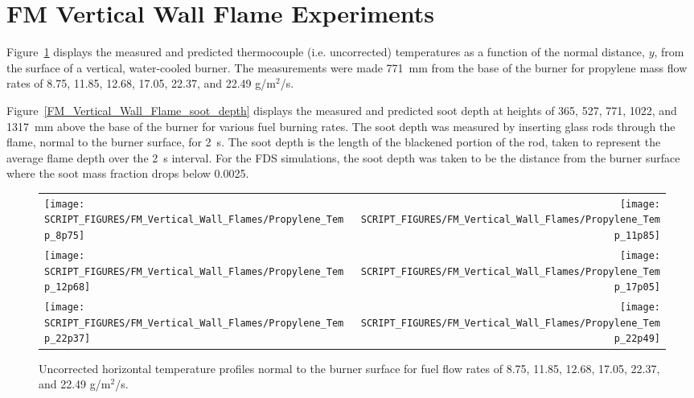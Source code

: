\clearpage

\section{FM Vertical Wall Flame Experiments}

Figure~\ref{FM_Vertical_Wall_Flame_temperature} displays the measured and predicted thermocouple (i.e. uncorrected) temperatures as a function of the normal distance, $y$, from the surface of a vertical, water-cooled burner. The measurements were made 771~mm from the base of the burner for propylene mass flow rates of 8.75, 11.85, 12.68, 17.05, 22.37, and 22.49 g/m$^2$/s.

Figure~\ref{FM_Vertical_Wall_Flame_soot_depth} displays the measured and predicted soot depth at heights of 365, 527, 771, 1022, and 1317~mm above the base of the burner for various fuel burning rates. The soot depth was measured by inserting glass rods through the flame, normal to the burner surface, for 2~s. The soot depth is the length of the blackened portion of the rod, taken to represent the average flame depth over the 2~s interval. For the FDS simulations, the soot depth was taken to be the distance from the burner surface where the soot mass fraction drops below 0.0025.

\begin{figure}[p]
\begin{tabular*}{\textwidth}{l@{\extracolsep{\fill}}r}
\texttt{[image: SCRIPT\_FIGURES/FM\_Vertical\_Wall\_Flames/Propylene\_Temp\_8p75]} &
\texttt{[image: SCRIPT\_FIGURES/FM\_Vertical\_Wall\_Flames/Propylene\_Temp\_11p85]} \\
\texttt{[image: SCRIPT\_FIGURES/FM\_Vertical\_Wall\_Flames/Propylene\_Temp\_12p68]} &
\texttt{[image: SCRIPT\_FIGURES/FM\_Vertical\_Wall\_Flames/Propylene\_Temp\_17p05]} \\
\texttt{[image: SCRIPT\_FIGURES/FM\_Vertical\_Wall\_Flames/Propylene\_Temp\_22p37]} &
\texttt{[image: SCRIPT\_FIGURES/FM\_Vertical\_Wall\_Flames/Propylene\_Temp\_22p49]}
\end{tabular*}
\caption[FM Vertical Wall Flame mean temperature profiles]
{Uncorrected horizontal temperature profiles normal to the burner surface for fuel flow rates of 8.75, 11.85, 12.68, 17.05, 22.37, and 22.49 g/m$^2$/s.}
\label{FM_Vertical_Wall_Flame_temperature}
\end{figure}

